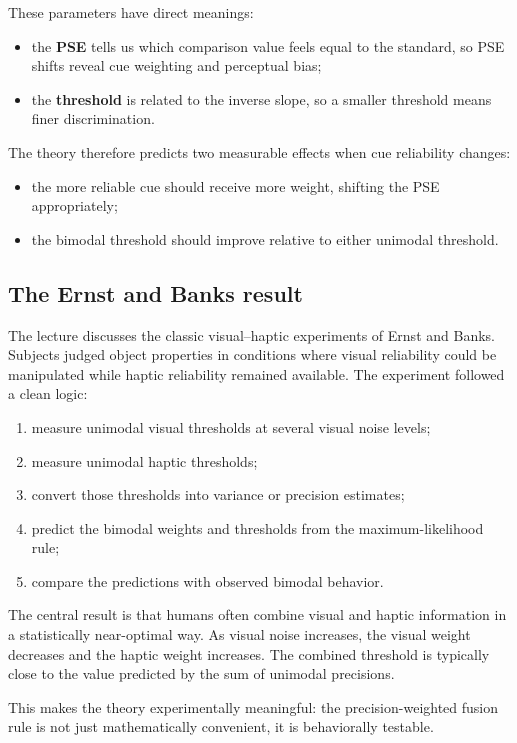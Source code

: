 These parameters have direct meanings:
\begin{itemize}
    \item the \textbf{PSE} tells us which comparison value feels equal to the standard, so PSE shifts reveal cue weighting and perceptual bias;
    \item the \textbf{threshold} is related to the inverse slope, so a smaller threshold means finer discrimination.
\end{itemize}

The theory therefore predicts two measurable effects when cue reliability changes:
\begin{itemize}
    \item the more reliable cue should receive more weight, shifting the PSE appropriately;
    \item the bimodal threshold should improve relative to either unimodal threshold.
\end{itemize}

\subsection{The Ernst and Banks result}

The lecture discusses the classic visual--haptic experiments of Ernst and Banks. Subjects judged object properties in conditions where visual reliability could be manipulated while haptic reliability remained available. The experiment followed a clean logic:
\begin{enumerate}
    \item measure unimodal visual thresholds at several visual noise levels;
    \item measure unimodal haptic thresholds;
    \item convert those thresholds into variance or precision estimates;
    \item predict the bimodal weights and thresholds from the maximum-likelihood rule;
    \item compare the predictions with observed bimodal behavior.
\end{enumerate}

The central result is that humans often combine visual and haptic information in a statistically near-optimal way. As visual noise increases, the visual weight decreases and the haptic weight increases. The combined threshold is typically close to the value predicted by the sum of unimodal precisions.

This makes the theory experimentally meaningful: the precision-weighted fusion rule is not just mathematically convenient, it is behaviorally testable.

